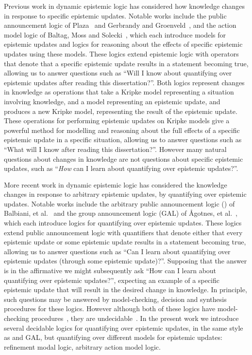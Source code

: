 Previous work in dynamic epistemic logic has considered how knowledge changes in response to specific epistemic updates.
Notable works include the public announcement logic of Plaza~\cite{plaza:1989} and Gerbrandy and Groenveld~\cite{gerbrandy:1997}, and the action model logic of Baltag, Moss and Solecki~\cite{baltag:1998,baltag:2004}, which each introduce models for epistemic updates and logics for reasoning about the effects of specific epistemic updates using these models.
These logics extend epistemic logic with operators that denote that a specific epistemic update results in a statement becoming true, allowing us to answer questions such as ``Will I know about quantifying over epistemic updates after reading this dissertation?''.
Both logics represent changes in knowledge as operations that take a Kripke model representing a situation involving knowledge, and a model representing an epistemic update, and produces a new Kripke model, representing the result of the epistemic update.
These operations for performing epistemic updates on Kripke models give a powerful method for modelling and reasoning about the full effects of a specific epistemic update in a specific situation, allowing us to answer questions such as ``What will I know after reading this dissertation?''.
However many natural questions about changes in knowledge are not questions about specific epistemic updates, such as ``{\em How} can I learn about quantifying over epistemic updates?''.

More recent work in dynamic epistemic logic has considered the knowledge changes in response to arbitrary epistemic updates, by quantifying over epistemic updates.
Notable works include the arbitrary public announcement logic (\logicApal{}) of Balbiani, et al.~\cite{balbiani:2007} and the group announcement logic (GAL) of {\AA}gotnes, et al.~\cite{agotnes:2008,agotnes:2010}, which each introduce logics for quantifying over epistemic updates.
These logics extend public announcement logic with quantifiers that denote either that every epistemic update or some epistemic update results in a statement becoming true, allowing us to answer questions such as ``Can I learn about quantifying over epistemic updates (through some epistemic update)?''.
Supposing that the answer is in the affirmative we might subsequently ask ``How can I learn about quantifying over epistemic updates?'', expecting an example of a specific epistemic update that will result in the desired change in knowledge.
In principle, such questions may be answered by model-checking, decision and synthesis procedures for these logics.
However although both of these logics have model-checking procedures~\cite{agotnes:2010}, they are undecidable~\cite{agotnes:2014}.
In the present work we introduce several decidable logics for quantifying over epistemic updates, in the same style as \logicApal{} and GAL, but quantifying over different models for epistemic updates: refinement modal logic, arbitrary action model logic.

